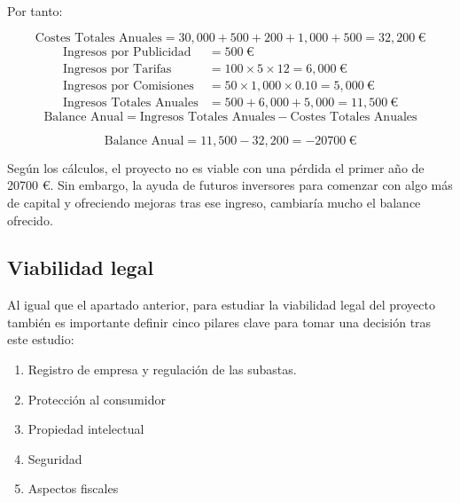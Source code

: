 	Por tanto:
	
	\begin{equation}
		\text{Costes\ Totales\ Anuales} = 30,000 + 500 + 200 + 1,000 + 500 = 32,200 \ \text{€}
	\end{equation}
	\begin{align}
		\text{Ingresos\ por\ Publicidad} &= 500 \ \text{€} \\
		\text{Ingresos\ por\ Tarifas} &= 100 \times 5 \times 12 = 6,000 \ \text{€} \\
		\text{Ingresos\ por\ Comisiones} &= 50 \times 1,000 \times 0.10 = 5,000 \ \text{€} \\
		\text{Ingresos\ Totales\ Anuales} &= 500 + 6,000 + 5,000 = 11,500 \ \text{€}
	\end{align}
	\begin{equation}
		\text{Balance\ Anual} = \text{Ingresos\ Totales\ Anuales} - \text{Costes\ Totales\ Anuales}
	\end{equation}

	\begin{equation}
		\text{Balance\ Anual} = 11,500 - 32,200 = -20700 \ \text{€}
	\end{equation}
	
	Según los cálculos, el proyecto no es viable con una pérdida el primer año de 20700 €. Sin embargo, la ayuda de futuros inversores para comenzar con algo más de capital y ofreciendo mejoras tras ese ingreso, cambiaría mucho el balance ofrecido.

\subsection{Viabilidad legal}

	Al igual que el apartado anterior, para estudiar la viabilidad legal del proyecto también es importante definir cinco pilares clave para tomar una decisión tras este estudio:
	\begin{enumerate}
		\item Registro de empresa y regulación de las subastas.
		\item Protección al consumidor
		\item Propiedad intelectual
		\item Seguridad
		\item Aspectos fiscales
	\end{enumerate}
	
